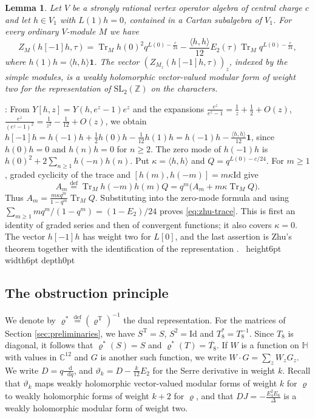 \documentclass[leqno]{article}
\newcommand{\Cbb}{\ensuremath{\mathbb{C}}}
\newcommand{\Z}{\ensuremath{\mathbb{Z}}}
\newcommand{\Id}{\mathrm{Id}}
\renewcommand{\geq}{\ensuremath{\geqslant}}
\newcommand{\qed}{\hfill \vrule height6pt  width6pt depth0pt}
\newcommand{\ovl}{\overline}
\newcommand{\ov}{\overset}
\renewcommand{\d}{\mathop{}\mathopen{}\mathrm{d}}
\renewcommand{\d}{\mathop{}\mathopen{}\mathrm{d}}
\newtheorem{lemma}[thm]{Lemma}
\newenvironment{proof}[1][]{\noindent {\it Proof #1} : }{\hbox{~}\qed
\smallskip
}
\numberwithin{equation}{section}
\begin{document}
\begin{lemma}
\label{lem:zhu-trace}
Let $V$ be a strongly rational vertex operator algebra of central charge $c$ and let $h \in V_1$ with $L(1)h = 0$, contained in a Cartan subalgebra of $V_1$. For every ordinary $V$-module $M$ we have
\begin{equation}
\label{eq:zhu-trace}
Z_M(h[-1]h,\tau) = \operatorname{Tr}_M h(0)^2q^{L(0)-\frac{c}{24}}-\frac{\langle h,h\rangle}{12}E_2(\tau)\operatorname{Tr}_M q^{L(0)-\frac{c}{24}},
\end{equation}
where $h(1)h = \langle h,h\rangle\mathbf 1$. The vector $(Z_{M_z}(h[-1]h,\tau))_z$, indexed by the simple modules, is a weakly holomorphic vector-valued modular form of weight two for the representation of $\mathrm{SL}_2(\Z)$ on the characters.
\end{lemma}

\begin{proof}
From $Y[h,z] = Y(h,e^z-1)e^z$ and the expansions $\frac{e^z}{e^z-1} = \frac1z+\frac12+O(z)$, $\frac{e^z}{(e^z-1)^2} = \frac{1}{z^2}-\frac{1}{12}+O(z)$, we obtain $h[-1]h = h(-1)h+\frac12h(0)h-\frac{1}{12}h(1)h = h(-1)h-\frac{\langle h,h\rangle}{12}\mathbf 1$, since $h(0)h = 0$ and $h(n)h = 0$ for $n \geq 2$. The zero mode of $h(-1)h$ is $h(0)^2+2\sum_{n \geq 1}h(-n)h(n)$. Put $\kappa = \langle h,h\rangle$ and $Q = q^{L(0)-c/24}$. For $m \geq 1$, graded cyclicity of the trace and $[h(m),h(-m)] = m\kappa\Id$ give
\[
A_m \ov{\mathrm{def}}{=} \operatorname{Tr}_M h(-m)h(m)Q
= q^m\big(A_m+m\kappa\operatorname{Tr}_M Q\big).
\]
Thus $A_m = \frac{m\kappa q^m}{1-q^m}\operatorname{Tr}_M Q$. Substituting into the zero-mode formula and using $\sum_{m \geq 1}mq^m/(1-q^m) = (1-E_2)/24$ proves \eqref{eq:zhu-trace}. This is first an identity of graded series and then of convergent functions; it also covers $\kappa = 0$. The vector $h[-1]h$ has weight two for $L[0]$, and the last assertion is Zhu's theorem \cite{Zhu96} together with the identification of the representation \cite{Hua08}.
\end{proof}

\subsection{The obstruction principle}

We denote by $\varrho^* \ov{\mathrm{def}}{=} (\varrho^{\mathrm T})^{-1}$ the dual representation. For the matrices of Section \ref{sec:preliminaries}, we have $S^{\mathrm T} = S$, $S^2 = \Id$ and $T_8^* = T_8^{-1}$. Since $T_8$ is diagonal, it follows that $\varrho^*(S) = S$ and $\varrho^*(T) = \ovl{T_8}$. If $W$ is a function on $\mathbb H$ with values in $\Cbb^{12}$ and $G$ is another such function, we write $W \cdot G = \sum_z W_zG_z$. We write $D = q\frac{\d}{\d q}$, and $\vartheta_k = D-\frac{k}{12}E_2$ for the Serre derivative in weight $k$. Recall that $\vartheta_k$ maps weakly holomorphic vector-valued modular forms of weight $k$ for $\varrho$ to weakly holomorphic forms of weight $k+2$ for $\varrho$, and that $DJ = -\frac{E_4^2E_6}{\Delta}$ is a weakly holomorphic modular form of weight two.
\end{document}
